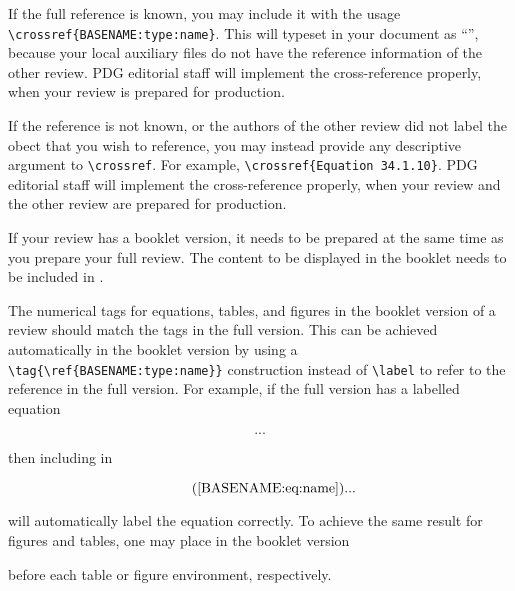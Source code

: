 If the full  reference is known, you may include it with the usage \\
\lstinline!\crossref{BASENAME:type:name}!. 
This will typeset in your document as ``'', because your local auxiliary files do not have the reference information of the other review.
PDG editorial staff will implement the cross-reference properly, when your review is prepared for production.

If the  reference is not known, or the authors of the other review did not label the obect that you wish to reference, 
you may instead provide any descriptive argument to \lstinline{\crossref}. 
For example, \lstinline!\crossref{Equation 34.1.10}!.  
PDG editorial staff will implement the cross-reference properly, when your review and the other review are prepared for production.

If your review has a booklet version, it needs to be prepared at the same time as you prepare your full review.
The content to be displayed in the booklet needs to be included in . 

The numerical tags for equations, tables, and figures in the booklet version of a review should match the tags in the full version. 
This can be achieved automatically in the booklet version by using a \lstinline!\tag{\ref{BASENAME:type:name}}! construction instead of \lstinline{\label}
to refer to the reference in the full version.
For example, if the full version has a labelled equation
\begin{verbtex}
\begin{equation}
	\label{BASENAME:eq:name}
	...
\end{equation}
\end{verbtex}
then including in 
\begin{verbtex}
\begin{equation}
	\tag{\ref{BASENAME:eq:name}}
	...
\end{equation}
\end{verbtex}
will automatically label the equation correctly. 
To achieve the same result for figures and tables, one may place in the booklet version
\begin{verbtex}
	\renewcommand{\thetable}{\ref{BASENAME:type:name}}
	\renewcommand{\thefigure}{\ref{BASENAME:type:name}}
\end{verbtex}
before each table or figure environment, respectively. 

